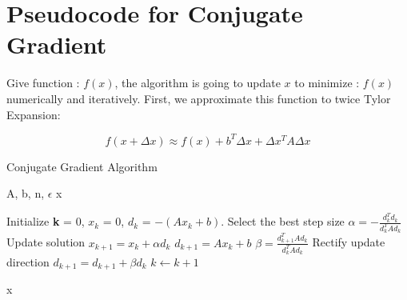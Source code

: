 \documentclass[titlepage,a4paper,12pt]{article}
\begin{document}
\section{Pseudocode for Conjugate Gradient}

Give function : $ f(x)$, the algorithm is going to update $x$ to minimize : $ f(x) $ numerically and iteratively.
First, we approximate this function to twice Tylor Expansion:

\begin{equation}
	f(x+\Delta x) \approx f(x)+ b^{T} \Delta x+\Delta x^{T} A \Delta x
\end{equation}

\begin{algorithm}[h]
	\caption{Conjugate Gradient Algorithm}
	\begin{algorithmic}[1]
		\Require A, b, n, $\epsilon$
		\Ensure x

		\State Initialize {\bf k} = 0, {\bf $x_k$} = 0,  {\bf $d_k$} = $- (A x_k + b)$.
			\State Select the best step size $\alpha = -\frac{d_{k}^{T} d_{k}}{d_{k}^{T} A d_{k}}$
			\State Update solution $x_{k + 1} = x_{k} + \alpha d_{k}$
			\State $d_{k + 1} = A x_{k} + b$
			\State $\beta = \frac{d_{k + 1}^{T} A d_{k}}{d_{k}^{T} A d_{k}}$
			\State Rectify update direction $d_{k + 1} = d_{k + 1} + \beta d_{k}$
			\State $k \leftarrow k + 1$ 
		\EndWhile

		\State \Return x
	\end{algorithmic}

\end{algorithm}
\end{document}
